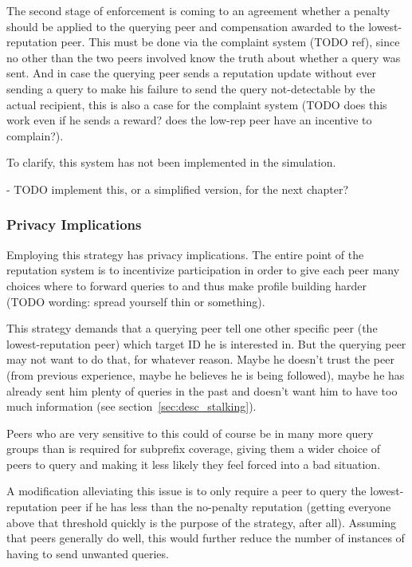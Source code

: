The second stage of enforcement is coming to an agreement whether a penalty
should be applied to the querying peer and compensation awarded to the
lowest-reputation peer. This must be done via the complaint system (TODO ref),
since no other than the two peers involved know the truth about whether a query
was sent. And in case the querying peer sends a reputation update without ever
sending a query to make his failure to send the query not-detectable by the
actual recipient, this is also a case for the complaint system (TODO does this
work even if he sends a reward? does the low-rep peer have an incentive to
complain?).

To clarify, this system has not been implemented in the simulation.

- TODO implement this, or a simplified version, for the next chapter?

\subsubsection{Privacy Implications}
\label{sec:selection_overlap_rep_sorted_privacy}
Employing this strategy has privacy implications. The entire point of the
reputation system is to incentivize participation in order to give each peer
many choices where to forward queries to and thus make profile building harder
(TODO wording: spread yourself thin or something).

This strategy demands that a querying peer tell one other specific peer (the
lowest-reputation peer) which target ID he is interested in. But the querying
peer may not want to do that, for whatever reason. Maybe he doesn't trust the
peer (from previous experience, maybe he believes he is being followed), maybe
he has already sent him plenty of queries in the past and doesn't want him to
have too much information (see section~\ref{sec:desc_stalking}).

Peers who are very sensitive to this could of course be in many more query
groups than is required for subprefix coverage, giving them a wider choice of
peers to query and making it less likely they feel forced into a bad situation.

A modification alleviating this issue is to only require a peer to query the
lowest-reputation peer if he has less than the no-penalty reputation (getting
everyone above that threshold quickly is the purpose of the strategy, after
all). Assuming that peers generally do well, this would further reduce the
number of instances of having to send unwanted queries.

